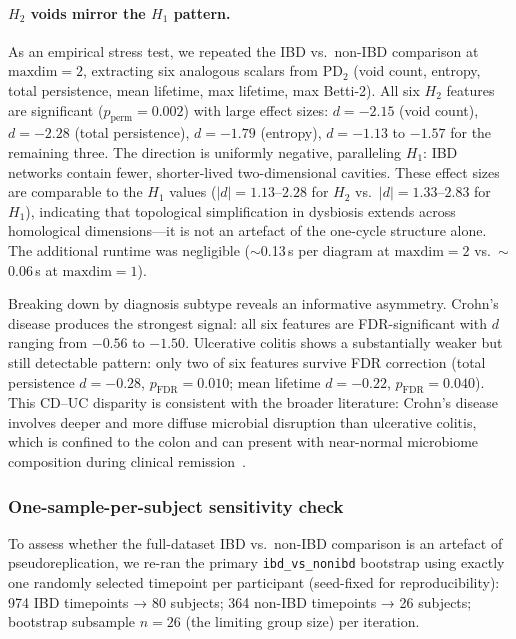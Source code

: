 \paragraph{$H_2$ voids mirror the $H_1$ pattern.}
As an empirical stress test, we repeated the IBD vs.\ non-IBD comparison
at $\text{maxdim} = 2$, extracting six analogous scalars from $\mathrm{PD}_2$
(void count, entropy, total persistence, mean lifetime, max lifetime,
max Betti-2).
All six $H_2$ features are significant ($p_\text{perm} = 0.002$) with
large effect sizes: $d = -2.15$ (void count), $d = -2.28$ (total
persistence), $d = -1.79$ (entropy), $d = -1.13$ to $-1.57$ for the
remaining three.
The direction is uniformly negative, paralleling $H_1$: IBD networks
contain fewer, shorter-lived two-dimensional cavities.
These effect sizes are comparable to the $H_1$ values ($|d| = 1.13$--$2.28$
for $H_2$ vs.\ $|d| = 1.33$--$2.83$ for $H_1$), indicating that topological
simplification in dysbiosis extends across homological dimensions---it is
not an artefact of the one-cycle structure alone.
The additional runtime was negligible ($\sim$0.13\,s per diagram at
$\text{maxdim} = 2$ vs.\ $\sim$0.06\,s at $\text{maxdim} = 1$).

Breaking down by diagnosis subtype reveals an informative asymmetry.
Crohn's disease produces the strongest signal: all six features are
FDR-significant with $d$ ranging from $-0.56$ to $-1.50$.
Ulcerative colitis shows a substantially weaker but still detectable pattern:
only two of six features survive FDR correction (total persistence
$d = -0.28$, $p_\text{FDR} = 0.010$; mean lifetime $d = -0.22$,
$p_\text{FDR} = 0.040$).
This CD--UC disparity is consistent with the broader literature: Crohn's
disease involves deeper and more diffuse microbial disruption than
ulcerative colitis, which is confined to the colon and can present with
near-normal microbiome composition during clinical
remission~\citep{halfvarson2017dynamics,gevers2014treatment}.

\subsubsection*{One-sample-per-subject sensitivity check}
\label{subsubsec:ibdmdb_1ps}

To assess whether the full-dataset IBD vs.\ non-IBD comparison is an artefact
of pseudoreplication, we re-ran the primary \texttt{ibd\_vs\_nonibd} bootstrap
using exactly one randomly selected timepoint per participant (seed-fixed for
reproducibility): 974 IBD timepoints → 80 subjects; 364 non-IBD timepoints →
26 subjects; bootstrap subsample $n = 26$ (the limiting group size) per
iteration.

